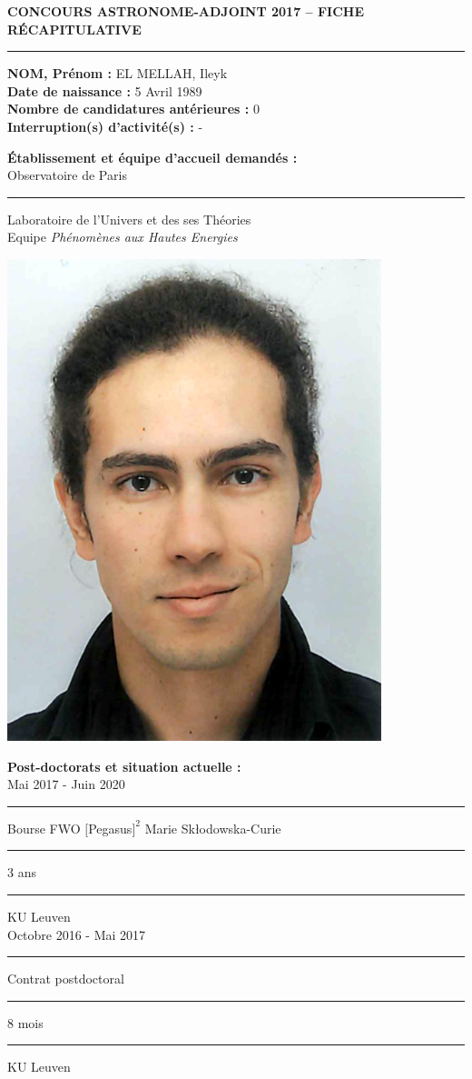 \documentclass[11pt]{article}
\begin{document}
\begin{center}
\textbf {CONCOURS ASTRONOME-ADJOINT 2017 -- FICHE R\'ECAPITULATIVE}\\ 
\vspace{0.2cm}


\hrule
\end{center}


\begin{minipage}{11cm}

\vspace{0.2cm}

{\bf NOM, Pr\'enom :} EL MELLAH, Ileyk\\
{\bf Date de naissance :} 5 Avril 1989 \\
{\bf Nombre de candidatures ant\'erieures :} 0 \\
{\bf Interruption(s) d'activit\'e(s) :}  - 

\vspace{0.1cm}

{\bf \'Etablissement et \'equipe d'accueil demand\'es :}\\
Observatoire de Paris \rule[-0.4ex]{0.2ex}{1.2em} Laboratoire de l'Univers et des ses Th\'eories\\ Equipe \textit{Ph\'enom\`enes aux Hautes Energies}




\end{minipage}  
\hspace{1.5cm}
\begin{minipage}{4cm}
\includegraphics[height=4.cm] {ID_photo.png}
\end{minipage}



\vspace{0cm}
{\bf Post-doctorats et situation actuelle :}\\
Mai 2017 - Juin 2020 \rule[-0.4ex]{0.2ex}{1.2em} Bourse FWO $[$Pegasus$]^2$ Marie Sk\l{}odowska-Curie \rule[-0.4ex]{0.2ex}{1.2em} 3 ans \rule[-0.4ex]{0.2ex}{1.2em} KU Leuven\\
Octobre 2016 - Mai 2017 \rule[-0.4ex]{0.2ex}{1.2em} Contrat postdoctoral \rule[-0.4ex]{0.2ex}{1.2em} 8 mois \rule[-0.4ex]{0.2ex}{1.2em} KU Leuven\\
\end{document}
